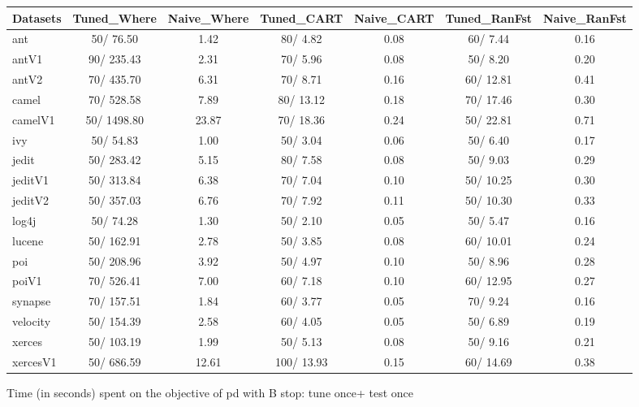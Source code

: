 \documentclass{acm_proc_article-sp}
\begin{document}
\clearpage
\begin{figure*}[!ht]
\scriptsize
\centering
  \begin{tabular}{l|c |c |c |c |c |c }
    \hline\hline
    Datasets & Tuned\_Where & Naive\_Where & Tuned\_CART & Naive\_CART & Tuned\_RanFst & Naive\_RanFst\\
    \hline
    ant & 50/ 76.50 & 1.42 & 80/ 4.82 & 0.08 & 60/ 7.44 & 0.16\\
    antV1 & 90/ 235.43 & 2.31 & 70/ 5.96 & 0.08 & 50/ 8.20 & 0.20\\
    antV2 & 70/ 435.70 & 6.31 & 70/ 8.71 & 0.16 & 60/ 12.81 & 0.41\\
    camel & 70/ 528.58 & 7.89 & 80/ 13.12 & 0.18 & 70/ 17.46 & 0.30\\
    camelV1 & 50/ 1498.80 & 23.87 & 70/ 18.36 & 0.24 & 50/ 22.81 & 0.71\\
    ivy & 50/ 54.83 & 1.00 & 50/ 3.04 & 0.06 & 50/ 6.40 & 0.17\\
    jedit & 50/ 283.42 & 5.15 & 80/ 7.58 & 0.08 & 50/ 9.03 & 0.29\\
    jeditV1 & 50/ 313.84 & 6.38 & 70/ 7.04 & 0.10 & 50/ 10.25 & 0.30\\
    jeditV2 & 50/ 357.03 & 6.76 & 70/ 7.92 & 0.11 & 50/ 10.30 & 0.33\\
    log4j & 50/ 74.28 & 1.30 & 50/ 2.10 & 0.05 & 50/ 5.47 & 0.16\\
    lucene & 50/ 162.91 & 2.78 & 50/ 3.85 & 0.08 & 60/ 10.01 & 0.24\\
    poi & 50/ 208.96 & 3.92 & 50/ 4.97 & 0.10 & 50/ 8.96 & 0.28\\
    poiV1 & 70/ 526.41 & 7.00 & 60/ 7.18 & 0.10 & 60/ 12.95 & 0.27\\
    synapse & 70/ 157.51 & 1.84 & 60/ 3.77 & 0.05 & 70/ 9.24 & 0.16\\
    velocity & 50/ 154.39 & 2.58 & 60/ 4.05 & 0.05 & 50/ 6.89 & 0.19\\
    xerces & 50/ 103.19 & 1.99 & 50/ 5.13 & 0.08 & 50/ 9.16 & 0.21\\
    xercesV1 & 50/ 686.59 & 12.61 & 100/ 13.93 & 0.15 & 60/ 14.69 & 0.38\\
  \end{tabular}
  \caption{Time (in seconds) spent on the objective of pd with B stop: tune once+ test once}
\end{figure*}
\end{document}
